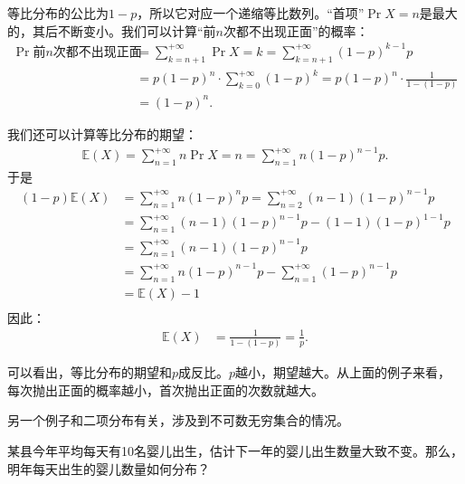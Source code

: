 \documentclass[12pt,UTF8,fontset=none]{ctexbook}
\begin{document}
等比分布的公比为$1 - p$，所以它对应一个递缩等比数列。“首项”$\Pr{X=n}$是最大的，其后不断变小。我们可以计算“前$n$次都不出现正面”的概率：
\begin{align*}
    \Pr{\mbox{前}n\mbox{次都不出现正面}} &= \sum_{k=n+1}^{+\infty} \Pr{X=k} = \sum_{k=n+1}^{+\infty} (1 - p)^{k-1}p\\ 
    &= p(1 - p)^{n}\cdot \sum_{k=0}^{+\infty} (1 - p)^k = p(1 - p)^{n}\cdot \frac{1}{1 - (1 - p)} \\
    &= (1 - p)^{n}.
\end{align*}

我们还可以计算等比分布的期望：
\begin{align*}
    \mathbb{E}(X) = \sum_{n=1}^{+\infty} n \Pr{X=n} = \sum_{n=1}^{+\infty} n(1 - p)^{n-1} p.
\end{align*}
于是
\begin{align*}
    (1 - p)\mathbb{E}(X) &=\sum_{n=1}^{+\infty} n(1 - p)^{n} p = \sum_{n=2}^{+\infty} (n - 1)(1 - p)^{n-1} p \\
    &= \sum_{n=1}^{+\infty} (n - 1)(1 - p)^{n-1} p - (1 - 1)(1 - p)^{1-1} p \\ 
    &= \sum_{n=1}^{+\infty} (n - 1)(1 - p)^{n-1} p \\
    &= \sum_{n=1}^{+\infty} n(1 - p)^{n-1} p - \sum_{n=1}^{+\infty} (1 - p)^{n-1} p \\
    &= \mathbb{E}(X) - 1 \\
\end{align*}
因此：
\begin{align*}
    \mathbb{E}(X) &= \frac{1}{1 - (1 - p)} = \frac{1}{p}.
\end{align*}

可以看出，等比分布的期望和$p$成反比。$p$越小，期望越大。从上面的例子来看，每次抛出正面的概率越小，首次抛出正面的次数就越大。

另一个例子和二项分布有关，涉及到不可数无穷集合的情况。

\begin{ex}
    某县今年平均每天有10名婴儿出生，估计下一年的婴儿出生数量大致不变。那么，明年每天出生的婴儿数量如何分布？
\end{ex}
\end{document}
